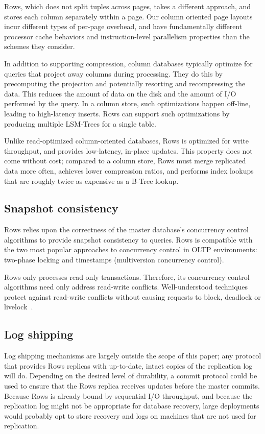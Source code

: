 \documentclass{sig-alternate-sigmod08}
\newcommand{\rows}{Rows\xspace}
\begin{document}
\rows, which does not split tuples across pages, takes a different
approach, and stores each column separately within a page.  Our column
oriented page layouts incur different types of per-page overhead, and
have fundamentally different processor
cache behaviors and instruction-level parallelism properties than the
schemes they consider.

In addition to supporting compression, column databases typically
optimize for queries that project away columns during processing.
They do this by precomputing the projection and potentially resorting
and recompressing the data.  This reduces the amount of data on the
disk and the amount of I/O performed by the query.  In a
column store, such optimizations happen off-line, leading to
high-latency inserts.  \rows can support such optimizations by
producing multiple LSM-Trees for a single table.

Unlike read-optimized column-oriented databases, \rows is optimized
for write throughput, and provides low-latency, in-place updates.
This property does not come without cost; compared to a column
store, \rows must merge replicated data more often, achieves lower
compression ratios, and performs index lookups that are roughly twice
as expensive as a B-Tree lookup.

\subsection{Snapshot consistency}

\rows relies upon the correctness of the master database's concurrency
control algorithms to provide snapshot consistency to queries.  \rows
is compatible with the two most popular approaches to concurrency
control in OLTP environments: two-phase locking and timestamps
(multiversion concurrency control).

\rows only processes read-only transactions.  Therefore, its
concurrency control algorithms need only address read-write conflicts.
Well-understood techniques protect against read-write conflicts
without causing requests to block, deadlock or
livelock~\cite{concurrencyControl}.

\subsection{Log shipping}

Log shipping mechanisms are largely outside the scope of this paper;
any protocol that provides \rows replicas with up-to-date, intact
copies of the replication log will do.  Depending on the desired level
of durability, a commit protocol could be used to ensure that the
\rows replica receives updates before the master commits.  Because
\rows is already bound by sequential I/O throughput, and because the
replication log might not be appropriate for database recovery, large
deployments would probably opt to store recovery and logs on machines
that are not used for replication.
\end{document}
